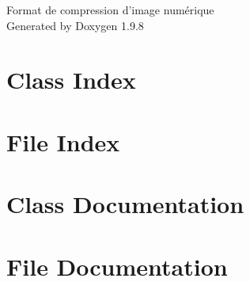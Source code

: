 \documentclass[twoside]{book}
\newcommand{\+}{\discretionary{\mbox{\scriptsize$\hookleftarrow$}}{}{}}
\newcommand{\clearemptydoublepage}{%
    \newpage{\pagestyle{empty}\cleardoublepage}%
  }
\begin{document}
  \raggedbottom
    \hypersetup{pageanchor=false,
                bookmarksnumbered=true,
                pdfencoding=unicode
               }
  \begin{titlepage}
  \vspace*{7cm}
  \begin{center}%
  {\Large Format de compression d’image numérique}\\
  \vspace*{1cm}
  {\large Generated by Doxygen 1.9.8}\\
  \end{center}
  \end{titlepage}
  \clearemptydoublepage
  \tableofcontents
  \clearemptydoublepage
  \hypersetup{pageanchor=true}
\chapter{Class Index}

\chapter{File Index}

\chapter{Class Documentation}




\chapter{File Documentation}










  \backmatter
  \newpage
  \clearemptydoublepage
  \printindex
\end{document}
